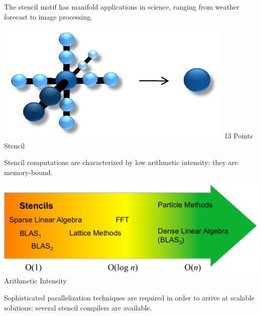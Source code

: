 \documentclass[portrait,a0paper,fontscale=0.292]{baposter}
\begin{document}
\begin{poster}
{		The stencil motif has manifold applications in science, ranging from 
		weather forecast to image processing.
		\begin{center}
			\begin{minipage}[t]{0.35\textwidth}
				\includegraphics[width=\textwidth]{laplacian}
				\centering\hspace*{1ex}\hspace{1ex}\scriptsize 13 Points Stencil
			\end{minipage}
		\end{center}	
		Stencil computations are characterized by low arithmetic intensity: 
		they are memory-bound.
		\begin{center}
			\begin{minipage}[t]{1\textwidth}
				\includegraphics[width=\textwidth]{ai.pdf}
				\centering\hspace*{1ex}\hspace{1ex}\hspace{1ex}\scriptsize Arithmetic Intensity
			\end{minipage}
		\end{center}	
		Sophisticated parallelization techniques are required in order to arrive 
		at scalable solutions: several stencil compilers are available.
   }


\end{poster}
\end{document}
